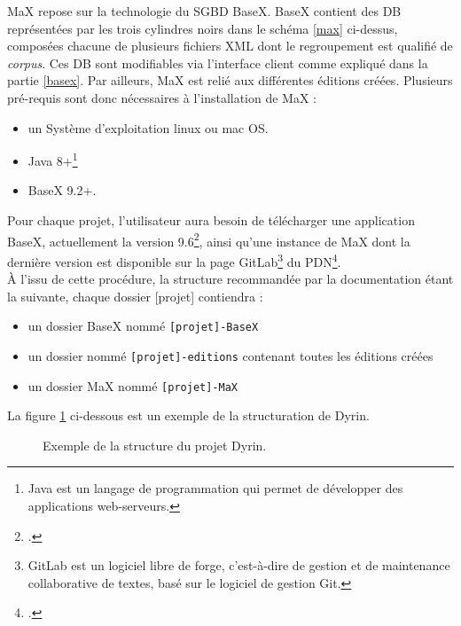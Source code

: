 \documentclass[a4paper,12pt,twoside]{book}
\begin{document}
MaX repose sur la technologie du \acrlong{SGBD} BaseX. BaseX contient des \acrfull{DB} représentées par les trois cylindres noirs dans le schéma \ref{max} ci-dessus, composées chacune de plusieurs fichiers XML dont le regroupement est qualifié de \textit{corpus}. Ces \acrshort{DB} sont modifiables via l'interface client comme expliqué dans la partie \ref{basex}. Par ailleurs, MaX est relié aux différentes éditions créées.
Plusieurs pré-requis sont donc nécessaires à l'installation de MaX :
\begin{itemize}
    \item un Système d'exploitation linux ou mac OS.
    \item Java 8+\footnote{Java est un langage de programmation qui permet de développer des applications web-serveurs.}
    \item BaseX 9.2+.
\end{itemize}

Pour chaque projet, l'utilisateur aura besoin de télécharger une application BaseX, actuellement la version 9.6\footcite{download-basex}, ainsi qu'une instance de MaX dont la dernière version est disponible sur la page GitLab\footnote{GitLab est un logiciel libre de forge, c'est-à-dire de gestion et de maintenance collaborative de textes, basé sur le logiciel de gestion Git. } du PDN\footcite{pdn-certic}.\\
À l'issu de cette procédure, la structure recommandée par la documentation étant la suivante, chaque dossier [projet] contiendra :
\begin{itemize}
    \item un dossier BaseX nommé \texttt{[projet]-BaseX}
    \item un dossier nommé \texttt{[projet]-editions} contenant toutes les éditions créées
    \item un dossier MaX nommé \texttt{[projet]-MaX}
\end{itemize}

La figure \ref{structure_dyrin} ci-dessous est un exemple de la structuration de Dyrin.

\begin{figure}[H]
    \centering
    \caption{Exemple de la structure du projet Dyrin.}
    \label{structure_dyrin}
\end{figure}
\end{document}
